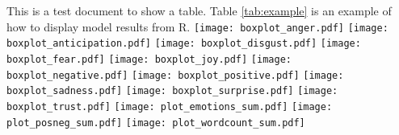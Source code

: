 \documentclass{article} %
\begin{document}
This is a test document to show a table. Table \ref{tab:example} is an example of how to display model results from R. %
\texttt{[image: boxplot\_anger.pdf]}
\texttt{[image: boxplot\_anticipation.pdf]}
\texttt{[image: boxplot\_disgust.pdf]}
\texttt{[image: boxplot\_fear.pdf]}
\texttt{[image: boxplot\_joy.pdf]}
\texttt{[image: boxplot\_negative.pdf]}
\texttt{[image: boxplot\_positive.pdf]}
\texttt{[image: boxplot\_sadness.pdf]}
\texttt{[image: boxplot\_surprise.pdf]}
\texttt{[image: boxplot\_trust.pdf]}
\texttt{[image: plot\_emotions\_sum.pdf]}
\texttt{[image: plot\_posneg\_sum.pdf]}
\texttt{[image: plot\_wordcount\_sum.pdf]}
\end{document}
